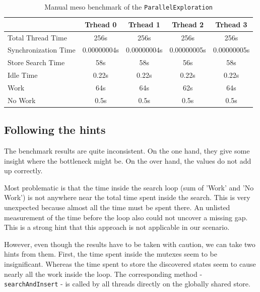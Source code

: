 \begin{center}
    \begin{table}[H]
        \centering
        \begin{tabular}{ | l | c | c | c | c |}
            \hline
            \textbf{} & \textbf{Trhead 0} & \textbf{Trhead 1} & \textbf{Trhead 2} & \textbf{Trhead 3}\\ \hline
            Total Thread Time & 256s & 256s & 256s & 256s \\ 
            Synchronization Time & 0.00000004s & 0.00000004s & 0.00000005s & 0.00000005s \\
            Store Search Time & 58s & 58s & 56s & 58s \\ 
            Idle Time & 0.22s & 0.22s & 0.22s & 0.22s \\ 
            Work & 64s & 64s & 62s & 64s \\ 
            No Work & 0.5s & 0.5s & 0.5s & 0.5s \\ \hline
        \end{tabular}
        \caption{Manual meso benchmark of the \texttt{ParallelExploration}}
        \label{ManualBenchmark}
    \end{table}
\end{center}

\subsection{Following the hints}
The benchmark results are quite inconsistent. On the one hand, they give some insight where the bottleneck might be. On the over hand, the values do not add up correctly.

Most problematic is that the time inside the search loop (sum of 'Work' and 'No Work') is not anywhere near the total time spent inside the search. This is very unexpected because almost all the time must be spent there. An unlisted measurement of the time before the loop also could not uncover a missing gap. This is a strong hint that this approach is not applicable in our scenario.

However, even though the results have to be taken with caution, we can take two hints from them. First, the time spent inside the mutexes seem to be insignificant. Whereas the time spent to store the discovered states seem to cause nearly all the work inside the loop. The corresponding method - \texttt{searchAndInsert} - is called by all threads directly on the globally shared store.

